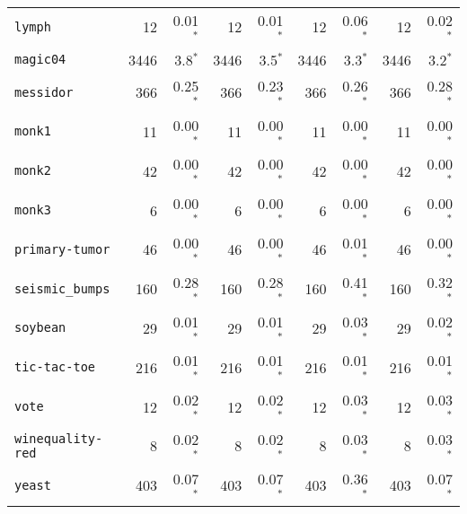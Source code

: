 \begin{tabular}{lrrrrrrrr}
\texttt{lymph} & 12 & 0.01$^*$ & 12 & 0.01$^*$ & 12 & 0.06$^*$ & 12 & 0.02$^*$\\
\texttt{magic04} & 3446 & 3.8$^*$ & 3446 & 3.5$^*$ & 3446 & 3.3$^*$ & 3446 & 3.2$^*$\\
\texttt{messidor} & 366 & 0.25$^*$ & 366 & 0.23$^*$ & 366 & 0.26$^*$ & 366 & 0.28$^*$\\
\texttt{monk1} & 11 & 0.00$^*$ & 11 & 0.00$^*$ & 11 & 0.00$^*$ & 11 & 0.00$^*$\\
\texttt{monk2} & 42 & 0.00$^*$ & 42 & 0.00$^*$ & 42 & 0.00$^*$ & 42 & 0.00$^*$\\
\texttt{monk3} & 6 & 0.00$^*$ & 6 & 0.00$^*$ & 6 & 0.00$^*$ & 6 & 0.00$^*$\\
\texttt{primary-tumor} & 46 & 0.00$^*$ & 46 & 0.00$^*$ & 46 & 0.01$^*$ & 46 & 0.00$^*$\\
\texttt{seismic\_bumps} & 160 & 0.28$^*$ & 160 & 0.28$^*$ & 160 & 0.41$^*$ & 160 & 0.32$^*$\\
\texttt{soybean} & 29 & 0.01$^*$ & 29 & 0.01$^*$ & 29 & 0.03$^*$ & 29 & 0.02$^*$\\
\texttt{tic-tac-toe} & 216 & 0.01$^*$ & 216 & 0.01$^*$ & 216 & 0.01$^*$ & 216 & 0.01$^*$\\
\texttt{vote} & 12 & 0.02$^*$ & 12 & 0.02$^*$ & 12 & 0.03$^*$ & 12 & 0.03$^*$\\
\texttt{winequality-red} & 8 & 0.02$^*$ & 8 & 0.02$^*$ & 8 & 0.03$^*$ & 8 & 0.03$^*$\\
\texttt{yeast} & 403 & 0.07$^*$ & 403 & 0.07$^*$ & 403 & 0.36$^*$ & 403 & 0.07$^*$\\
\bottomrule
\end{tabular}
